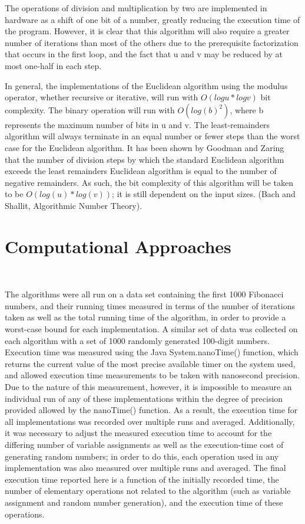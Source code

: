 \documentclass[11pt]{article}
\begin{document}
The operations of division and multiplication by two are implemented in hardware as a shift of one bit of a number, greatly reducing the execution time of the program. However, it is clear that this algorithm will also require a greater number of iterations than most of the others due to the prerequisite factorization that occurs in the first loop, and the fact that u and v may be reduced by at most one-half in each step.



In general, the implementations of the Euclidean algorithm using the modulus operator, whether recursive or iterative, will run with $O(logu * logv)$ bit complexity. The binary operation will run with $O(log(b)^2)$, where b represents the maximum number of bits in u and v.  The least-remainders algorithm will always terminate in an equal number or fewer steps than the worst case for the Euclidean algorithm. It has been shown by Goodman and Zaring that the number of division steps by which the standard Euclidean algorithm exceeds the least remainders Euclidean algorithm is equal to the number of negative remainders. As such, the bit complexity of this algorithm will be taken to be $O(log(u)*log(v))$; it is still dependent on the input sizes. (Bach and Shallit, Algorithmic Number Theory).

\section{Computational Approaches}$ $

\indent
The algorithms were all run on a data set containing the first 1000 Fibonacci numbers, and their running times measured in terms of the number of iterations taken as well as the total running time of the algorithm, in order to provide a worst-case bound for each implementation. A similar set of data was collected on each algorithm with a set of 1000 randomly generated 100-digit numbers. Execution time was measured using the Java System.nanoTime() function, which returns the current value of the most precise available timer on the system used, and allowed execution time measurements to be taken with nanosecond precision. Due to the nature of this measurement, however, it is impossible to measure an individual run of any of these implementations within the degree of precision provided allowed by the nanoTime() function. As a result, the execution time for all implementations was recorded over multiple runs and averaged. Additionally, it was necessary to adjust the measured execution time to account for the differing number of variable assignments as well as the execution-time cost of generating random numbers; in order to do this, each operation used in any implementation was also measured over multiple runs and averaged. The final execution time reported here is a function of the initially recorded time, the number of elementary operations not related to the algorithm (such as variable assignment and random number generation), and the execution time of these operations.
\end{document}
